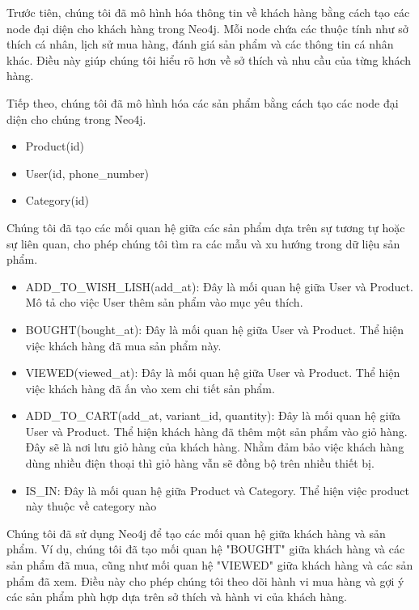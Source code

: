 \begin{enumerate}[a.]
Trước tiên, chúng tôi đã mô hình hóa thông tin về khách hàng bằng cách tạo các node đại diện cho khách hàng trong Neo4j. Mỗi node chứa các thuộc tính như sở thích cá nhân, lịch sử mua hàng, đánh giá sản phẩm và các thông tin cá nhân khác. Điều này giúp chúng tôi hiểu rõ hơn về sở thích và nhu cầu của từng khách hàng.

Tiếp theo, chúng tôi đã mô hình hóa các sản phẩm bằng cách tạo các node đại diện cho chúng trong Neo4j.
\begin{itemize}
    \item Product(id)
    \item User(id, phone\_number)
    \item Category(id)
\end{itemize}
Chúng tôi đã tạo các mối quan hệ giữa các sản phẩm dựa trên sự tương tự hoặc sự liên quan, cho phép chúng tôi tìm ra các mẫu và xu hướng trong dữ liệu sản phẩm. 
\begin{itemize}
    \item ADD\_TO\_WISH\_LISH(add\_at): Đây là mối quan hệ giữa User và Product. Mô tả cho việc User thêm sản phẩm vào mục yêu thích.

    \item BOUGHT(bought\_at): Đây là mối quan hệ giữa User và Product. Thể hiện việc khách hàng đã mua sản phẩm này.

    \item VIEWED(viewed\_at): Đây là mối quan hệ giữa User và Product. Thể hiện việc khách hàng đã ấn vào xem chi tiết sản phẩm.

    \item ADD\_TO\_CART(add\_at, variant\_id, quantity): Đây là mối quan hệ giữa User và Product. Thể hiện khách hàng đã thêm một sản phẩm vào giỏ hàng. Đây sẽ là nơi lưu giỏ hàng của khách hàng. Nhằm đảm bảo việc khách hàng dùng nhiều điện thoại thì giỏ hàng vẫn sẽ đồng bộ trên nhiều thiết bị.

    \item IS\_IN: Đây là mối quan hệ giữa Product và Category. Thể hiện việc product này thuộc về category nào
\end{itemize}
Chúng tôi đã sử dụng Neo4j để tạo các mối quan hệ giữa khách hàng và sản phẩm. Ví dụ, chúng tôi đã tạo mối quan hệ "BOUGHT" giữa khách hàng và các sản phẩm đã mua, cũng như mối quan hệ "VIEWED" giữa khách hàng và các sản phẩm đã xem. Điều này cho phép chúng tôi theo dõi hành vi mua hàng và gợi ý các sản phẩm phù hợp dựa trên sở thích và hành vi của khách hàng.


\end{enumerate}
